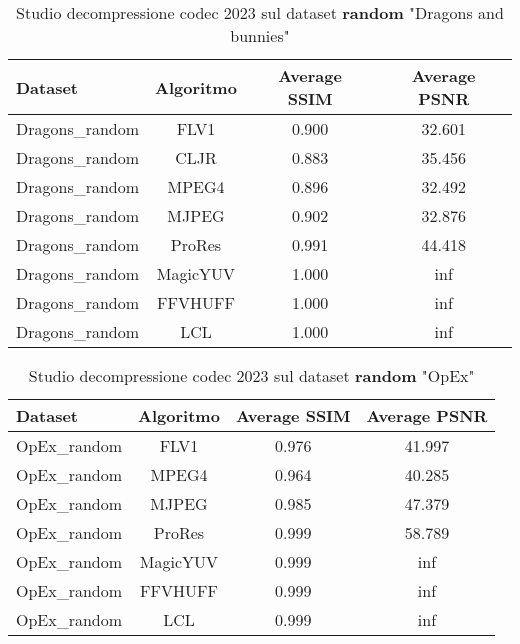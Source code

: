 \begin{table}[ht]
\centering
\begin{tabular}{|l|c|c|c|}
\hline
Dataset               & Algoritmo & Average SSIM & Average PSNR
\\ \hline
Dragons\_random       & FLV1      & 0.900        & 32.601       \\ \hline
Dragons\_random       & CLJR      & 0.883        & 35.456       \\ \hline
Dragons\_random       & MPEG4     & 0.896        & 32.492       \\ \hline
Dragons\_random       & MJPEG     & 0.902        & 32.876       \\ \hline
Dragons\_random       & ProRes    & 0.991        & 44.418       \\ \hline
Dragons\_random       & MagicYUV  & 1.000        & inf          \\ \hline
Dragons\_random       & FFVHUFF   & 1.000        & inf          \\ \hline
Dragons\_random       & LCL       & 1.000        & inf          \\ \hline
\end{tabular}
\caption{Studio decompressione codec 2023 sul dataset \textbf{random} "Dragons and bunnies"}
\end{table}

\begin{table}[ht]
\centering
\begin{tabular}{|l|c|c|c|}
\hline
Dataset               & Algoritmo & Average SSIM & Average PSNR
\\ \hline
OpEx\_random          & FLV1      & 0.976        & 41.997       \\ \hline
OpEx\_random          & MPEG4     & 0.964        & 40.285       \\ \hline
OpEx\_random          & MJPEG     & 0.985        & 47.379       \\ \hline
OpEx\_random          & ProRes    & 0.999        & 58.789       \\ \hline
OpEx\_random          & MagicYUV  & 0.999        & inf          \\ \hline
OpEx\_random          & FFVHUFF   & 0.999        & inf          \\ \hline
OpEx\_random          & LCL       & 0.999        & inf          \\ \hline
\end{tabular}
\caption{Studio decompressione codec 2023 sul dataset \textbf{random} "OpEx"}
\end{table}

